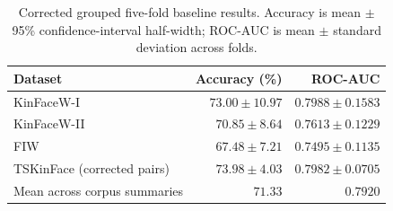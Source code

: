 \begin{table}[!t]
\centering
\caption{Corrected grouped five-fold baseline results. Accuracy is mean \(\pm\) 95\% confidence-interval half-width; ROC-AUC is mean \(\pm\) standard deviation across folds.}
\label{tab:main_corrected}
\begin{tabular}{lrr}
\toprule
Dataset & Accuracy (\%) & ROC-AUC \\
\midrule
KinFaceW-I & \(73.00 \pm 10.97\) & \(0.7988 \pm 0.1583\) \\
KinFaceW-II & \(70.85 \pm 8.64\) & \(0.7613 \pm 0.1229\) \\
FIW & \(67.48 \pm 7.21\) & \(0.7495 \pm 0.1135\) \\
TSKinFace (corrected pairs) & \(73.98 \pm 4.03\) & \(0.7982 \pm 0.0705\) \\
\midrule
Mean across corpus summaries & \(71.33\) & \(0.7920\) \\
\bottomrule
\end{tabular}
\end{table}
